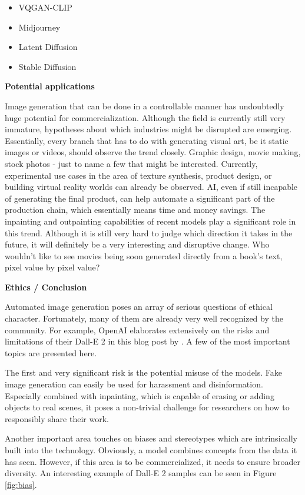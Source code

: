 \documentclass[
]{krantz}
\providecommand{\tightlist}{%
  \setlength{\itemsep}{0pt}\setlength{\parskip}{0pt}}
\begin{document}
\begin{itemize}
\tightlist
\item
  VQGAN-CLIP \citep{VQGANCLIP2022}
\item
  Midjourney \citep{Midjourney}
\item
  Latent Diffusion \citep{LatentDiffusion2021}
\item
  Stable Diffusion \citep{StableDiffusion2022}
\end{itemize}

\textbf{Potential applications}

Image generation that can be done in a controllable manner has undoubtedly huge potential for commercialization. Although the field is currently still very immature, hypotheses about which industries might be disrupted are emerging. Essentially, every branch that has to do with generating visual art, be it static images or videos, should observe the trend closely. Graphic design, movie making, stock photos - just to name a few that might be interested. Currently, experimental use cases in the area of texture synthesis, product design, or building virtual reality worlds can already be observed. AI, even if still incapable of generating the final product, can help automate a significant part of the production chain, which essentially means time and money savings. The inpainting and outpainting capabilities of recent models play a significant role in this trend. Although it is still very hard to judge which direction it takes in the future, it will definitely be a very interesting and disruptive change. Who wouldn't like to see movies being soon generated directly from a book's text, pixel value by pixel value?

\textbf{Ethics / Conclusion}

Automated image generation poses an array of serious questions of ethical character. Fortunately, many of them are already very well recognized by the community. For example, OpenAI elaborates extensively on the risks and limitations of their Dall-E 2 in this blog post by \citet{mishkin2022risks}. A few of the most important topics are presented here.

The first and very significant risk is the potential misuse of the models. Fake image generation can easily be used for harassment and disinformation. Especially combined with inpainting, which is capable of erasing or adding objects to real scenes, it poses a non-trivial challenge for researchers on how to responsibly share their work.

Another important area touches on biases and stereotypes which are intrinsically built into the technology. Obviously, a model combines concepts from the data it has seen. However, if this area is to be commercialized, it needs to ensure broader diversity. An interesting example of Dall-E 2 samples can be seen in Figure \ref{fig:bias}.
\end{document}
